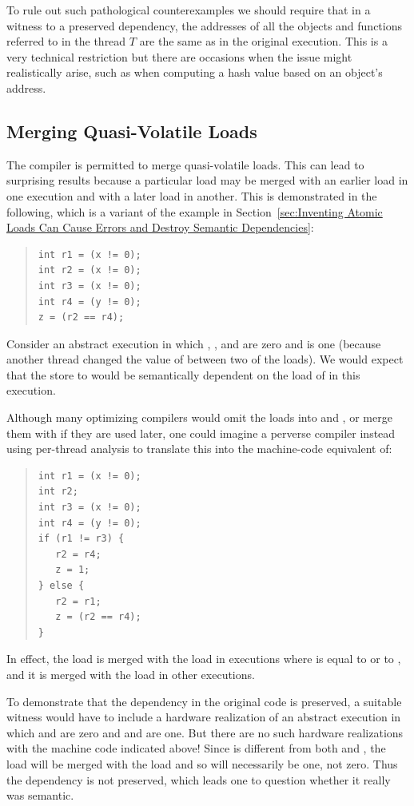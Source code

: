 To rule out such pathological counterexamples we should require that
in a witness to a preserved dependency, the addresses of all the
objects and functions referred to in the thread $T$ are the same as
in the original execution.
This is a very technical restriction but there are occasions when
the issue might realistically arise, such as when computing a hash
value based on an object's address.

\subsection{Merging Quasi-Volatile Loads}
\label{sec:Merging Quasi-Volatile Loads}

The compiler is permitted to merge quasi-volatile loads.
This can lead to surprising results because a particular load
may be merged with an earlier load in one execution and with a
later load in another.
This is demonstrated in the following, which is a variant of
the example in
Section~\ref{sec:Inventing Atomic Loads Can Cause Errors and
Destroy Semantic Dependencies}:
\begin{quote}
\begin{verbatim}
int r1 = (x != 0);
int r2 = (x != 0);
int r3 = (x != 0);
int r4 = (y != 0);
z = (r2 == r4);
\end{verbatim}
\end{quote}
Consider an abstract execution in which , , and 
are zero and  is one (because another thread changed the value
of  between two of the loads).
We would expect that the store to  would be semantically
dependent on the load of  in this execution.

Although many optimizing compilers would omit the loads into 
and , or merge them with  if they are used later, one
could imagine a perverse compiler instead using per-thread analysis to
translate this into the machine-code equivalent of:
\begin{quote}
\begin{verbatim}
int r1 = (x != 0);
int r2;
int r3 = (x != 0);
int r4 = (y != 0);
if (r1 != r3) {
   r2 = r4;
   z = 1;
} else {
   r2 = r1;
   z = (r2 == r4);
}
\end{verbatim}
\end{quote}
In effect, the  load is merged with the  load in
executions where  is equal to  or to , and it is
merged with the  load in other executions.

To demonstrate that the dependency in the original code is preserved,
a suitable witness would have
to include a hardware realization of an abstract execution in which
 and  are zero and  and  are one.
But there are no such hardware realizations with the
machine code indicated above!
Since  is different from both  and , the 
load will be merged with the  load and so  will
necessarily be one, not zero.
Thus the dependency is not preserved, which leads one to question
whether it really was semantic.

